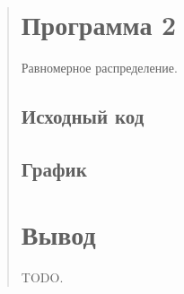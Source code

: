 \documentclass{article}
\begin{document}
\begin{quote}
\section{Программа 2}
	Равномерное распределение.
\subsection{Исходный код}
        \begin{minipage}{\linewidth}
	    
        \end{minipage}
\subsection{График}

\section{Вывод}
	TODO.
\end{quote}
\end{document}
